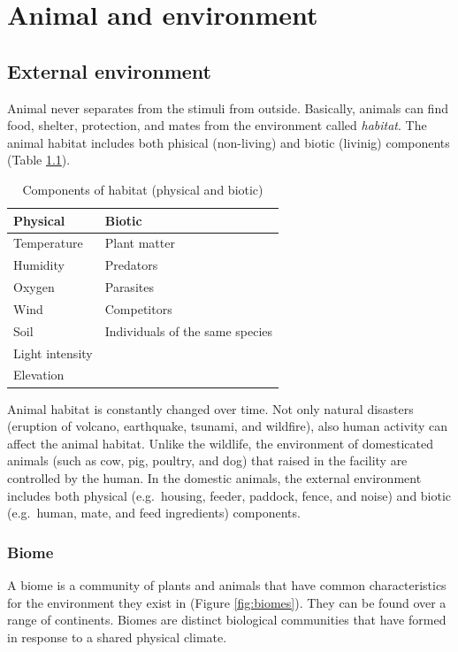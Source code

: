 \documentclass[]{book}
\begin{document}
\chapter{Animal and environment}\label{chapter2}

\section{External environment}\label{external-environment}

Animal never separates from the stimuli from outside. Basically, animals
can find food, shelter, protection, and mates from the environment
called \emph{habitat}. The animal habitat includes both phisical
(non-living) and biotic (livinig) components (Table \ref{tab:habitat}).

\begin{table}[t]

\caption{\label{tab:habitat}Components of habitat (physical and biotic)}
\centering
\begin{tabular}{ll}
\toprule
Physical & Biotic\\
\midrule
Temperature & Plant matter\\
Humidity & Predators\\
Oxygen & Parasites\\
Wind & Competitors\\
Soil & Individuals of the same species\\
\addlinespace
Light intensity & \\
Elevation & \\
\bottomrule
\end{tabular}
\end{table}

Animal habitat is constantly changed over time. Not only natural
disasters (eruption of volcano, earthquake, tsunami, and wildfire), also
human activity can affect the animal habitat. Unlike the wildlife, the
environment of domesticated animals (such as cow, pig, poultry, and dog)
that raised in the facility are controlled by the human. In the domestic
animals, the external environment includes both physical (e.g.~housing,
feeder, paddock, fence, and noise) and biotic (e.g.~human, mate, and
feed ingredients) components.

\subsection{Biome}\label{biome}

A biome is a community of plants and animals that have common
characteristics for the environment they exist in (Figure
\ref{fig:biomes}). They can be found over a range of continents. Biomes
are distinct biological communities that have formed in response to a
shared physical climate.
\end{document}
